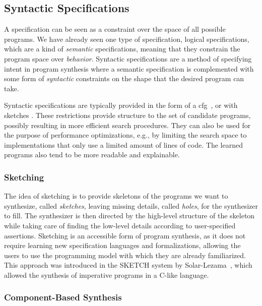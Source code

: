 \subsection{Syntactic Specifications}
\label{sec:syntactic-specifications}

A specification can be seen as a constraint over the space of all possible
programs. We have already seen one type of specification, logical
specifications, which are a kind of \textit{semantic} specifications, meaning
that they constrain the program space over \textit{behavior}. Syntactic
specifications are a method of specifying intent in program synthesis where a
semantic specification is complemented with some form of \textit{syntactic}
constraints on the shape that the desired program can take.

Syntactic specifications are typically provided in the form of a
\gls{cfg}~\cite{Alur:sygus:2013}, or with sketches \cite{Solar-Lezama:2008}.
These restrictions provide structure to the set of candidate programs, possibly
resulting in more efficient search procedures. They can also be used for the
purpose of performance optimizations, e.g., by limiting the search space to
implementations that only use a limited amount of lines of code. The learned
programs also tend to be more readable and explainable.

\subsubsection{Sketching}
\label{sec:sketching}

The idea of sketching is to provide skeletons of the programs we want to
synthesize, called \textit{sketches}, leaving missing details, called
\textit{holes}, for the synthesizer to fill. The synthesizer is then directed by
the high-level structure of the skeleton while taking care of finding the
low-level details according to user-specified assertions.
Sketching is an accessible form of program synthesis, as it does not require
learning new specification languages and formalizations, allowing the users to
use the programming model with which they are already familiarized.
This approach was introduced in the SKETCH system by
Solar-Lezama~\cite{Solar-Lezama:2008}, which allowed the synthesis of imperative
programs in a C-like language.

\subsubsection{Component-Based Synthesis}
\label{sec:components}

